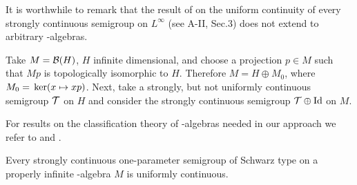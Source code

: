It is worthwhile to remark that the result of  \citet{lotz:1985} on the uniform continuity of every strongly continuous semigroup on $L^\infty$ (see A-II, Sec.3) does not extend to arbitrary \WA-algebras.
\begin{example}
Take $M = \mathcal{B}(H)$, $H$ infinite dimensional, and choose a projection $p \in M$ such that $Mp$ is topologically isomorphic to $H$.
Therefore $M = H \oplus M_{0}$, where $M_{0} = \mathop{}\mathrm{ker}(x \mapsto xp)$.
Next, take a strongly, but not uniformly continuous semigroup $\mathcal{T}$ on $H$ and consider the strongly continuous semigroup $\mathcal{T} \oplus \operatorname{Id}$ on $M$.
\end{example}
For results on the classification theory of \WA-algebras needed in our approach we refer to \citet[2.2]{sakai:1971} and \citet[V.1]{takesaki:1979}.
\begin{theorem}\label{thm:schwarz_uniform}
Every strongly continuous one-parameter semigroup of Schwarz type on a properly infinite \WA-algebra $M$ is uniformly continuous.
\end{theorem}
